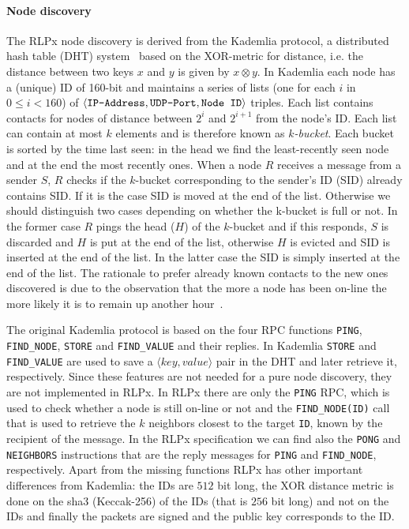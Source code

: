\paragraph{Node discovery}
The RLPx node discovery is derived from the Kademlia protocol,
a distributed hash table (DHT) system~\cite{bib:kademlia}
based on the XOR-metric for
distance, i.e. the distance between two keys $x$ and $y$ is given
by $x \otimes y$.
In Kademlia each node has a (unique) ID of 160-bit and maintains a
series of lists (one for each $i$ in $0 \leq i < 160$) of
$\langle \verb|IP-Address|, \verb|UDP-Port|, \verb|Node ID| \rangle$ triples.
Each list contains contacts for nodes of distance between $2^i$ and $2^{i+1}$
from the node's ID.
Each list can contain at most $k$ elements and is therefore known as
\textit{$k$-bucket}.
Each bucket is sorted by the time last
seen: in the head we find the least-recently seen node and at the end the most
recently ones.
When a node $R$ receives a message from a sender $S$, $R$ checks if the
$k$-bucket corresponding to the sender's ID (SID) already contains SID.
If it is the case SID is moved at the end of the list. Otherwise we should
distinguish two cases depending on whether the k-bucket is full or not.
In the former case $R$ pings the head ($H$) of the $k$-bucket and if
this responds, $S$ is discarded and $H$ is put at the end of the list,
otherwise $H$ is evicted and SID is inserted at the end of the list.
In the latter case the SID is simply inserted at the end of the list.
The rationale to prefer already known contacts to the new ones discovered
is due to the observation that the more a node has been on-line the more
likely it is to remain up another hour~\cite{bib:kademlia}.

The original Kademlia protocol is based on the four RPC functions
\verb|PING|, \verb|FIND_NODE|,
\verb|STORE| and \verb|FIND_VALUE| and their replies.
In Kademlia \verb|STORE| and \verb|FIND_VALUE| are used to save a
$\langle key, value\rangle$ pair in the DHT and later retrieve it, respectively.
Since these features are not needed for a pure node discovery, they
are not implemented in RLPx.
In RLPx there are only the \verb|PING| RPC, which is used to check whether a
node is still on-line or not and the \verb|FIND_NODE(ID)| call that is used to
retrieve the $k$ neighbors closest to the target \verb|ID|, known by the
recipient of the message. In the RLPx specification we can find also
the \verb|PONG| and \verb|NEIGHBORS| instructions that are the reply messages
for \verb|PING| and \verb|FIND_NODE|, respectively.
Apart from the missing functions RLPx has other important differences
from Kademlia:
the IDs are $512$ bit long, the XOR distance metric is done on the sha3
(Keccak-256) of the IDs (that is $256$ bit long) and not on the IDs and
finally the packets are signed and the public key corresponds to the ID.

